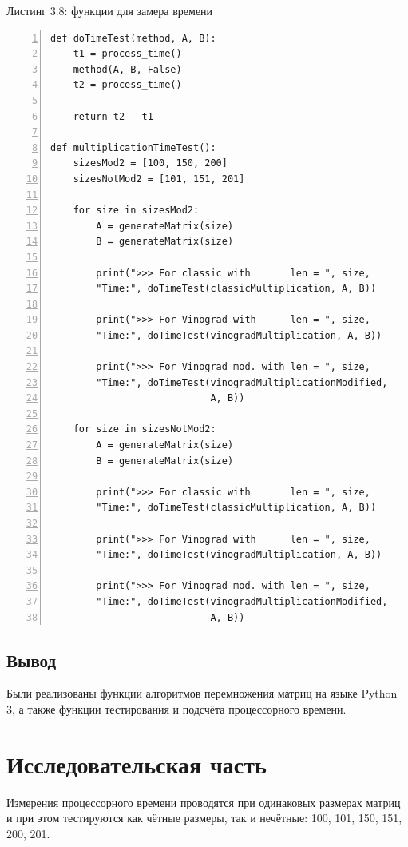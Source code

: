 \documentclass[12pt,a4paper]{report}
\begin{document}
\textrm{Листинг 3.8: функции для замера времени}
\begin{lstlisting}[frame=single, numbers=left]
def doTimeTest(method, A, B):
    t1 = process_time()
    method(A, B, False)
    t2 = process_time()

    return t2 - t1

def multiplicationTimeTest():
    sizesMod2 = [100, 150, 200]
    sizesNotMod2 = [101, 151, 201]

    for size in sizesMod2:
        A = generateMatrix(size)
        B = generateMatrix(size)

        print(">>> For classic with       len = ", size, 
        "Time:", doTimeTest(classicMultiplication, A, B))
        
        print(">>> For Vinograd with      len = ", size, 
        "Time:", doTimeTest(vinogradMultiplication, A, B))
        
        print(">>> For Vinograd mod. with len = ", size, 
        "Time:", doTimeTest(vinogradMultiplicationModified, 
                            A, B))

    for size in sizesNotMod2:
        A = generateMatrix(size)
        B = generateMatrix(size)

        print(">>> For classic with       len = ", size, 
        "Time:", doTimeTest(classicMultiplication, A, B))
        
        print(">>> For Vinograd with      len = ", size, 
        "Time:", doTimeTest(vinogradMultiplication, A, B))
        
        print(">>> For Vinograd mod. with len = ", size, 
        "Time:", doTimeTest(vinogradMultiplicationModified, 
                            A, B))
\end{lstlisting}

\section{Вывод}

Были реализованы функции алгоритмов перемножения матриц на языке Python 3, а также функции тестирования 
и подсчёта процессорного времени. 

\newpage
\chapter{Исследовательская часть}

Измерения процессорного времени проводятся при одинаковых размерах матриц и при этом тестируются как чётные 
размеры, так и нечётные: 100, 101, 150, 151, 200, 201. 
\end{document}
